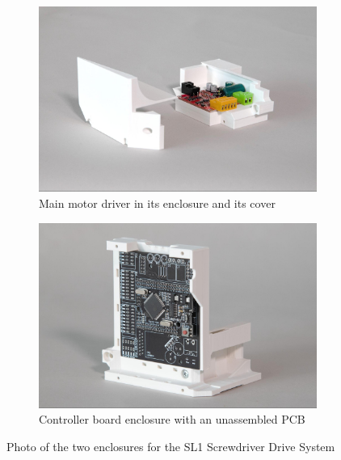 \begin{figure}[!h]
    \centering
    \begin{subfigure}[b]{0.49\textwidth}
        \centering
        \includegraphics[width=\textwidth]{images/7a/img65.jpg}
        \caption{Main motor driver in its enclosure and its cover}
        \label{fig:main-motor-driver-in-its-enclosure}
    \end{subfigure}
    \hfill
    \begin{subfigure}[b]{0.49\textwidth}
        \centering
        \includegraphics[width=\textwidth]{images/7a/img66.jpg}
        \caption{Controller board enclosure with an unassembled PCB}
        \label{fig:control-board-enclosure}
    \end{subfigure}
    \caption{Photo of the two enclosures for the SL1 Screwdriver Drive System}
\end{figure}


